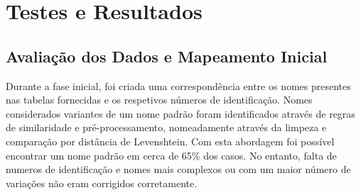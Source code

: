 \documentclass[a4paper,12pt]{article}
\begin{document}




% 
% 

\section{Testes e Resultados} \label{testes}

\subsection{Avaliação dos Dados e Mapeamento Inicial}

Durante a fase inicial, foi criada uma correspondência entre os nomes presentes nas tabelas fornecidas e os respetivos números de identificação. Nomes considerados variantes de um nome padrão foram identificados através de regras de similaridade e pré-processamento, nomeadamente através da limpeza e comparação por distância de Levenshtein. Com esta abordagem foi possível encontrar um nome padrão em cerca de 65\% dos casos. No entanto, falta de numeros de identificação e nomes mais complexos ou com um maior número de variações não eram corrigidos corretamente.
\end{document}
